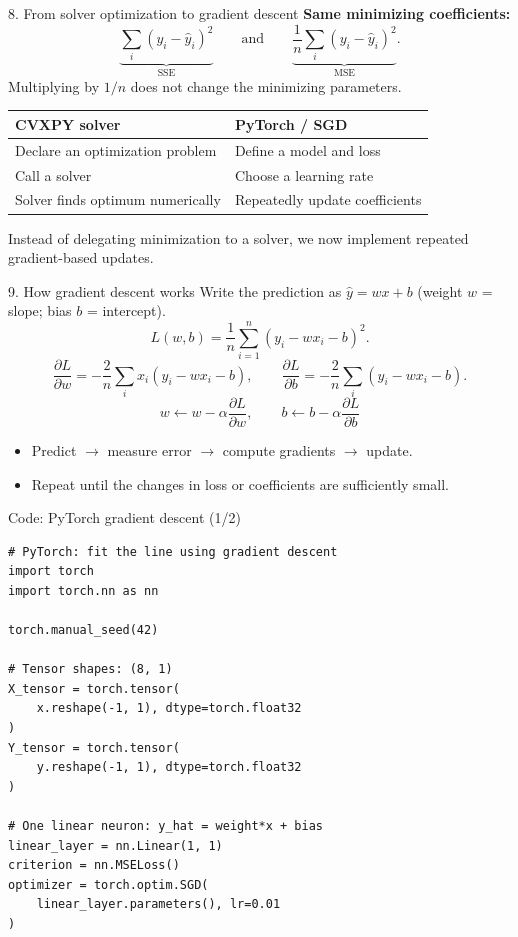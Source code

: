 \documentclass[aspectratio=43,11pt]{beamer}
\begin{document}
\begin{frame}{8. From solver optimization to gradient descent}
\small
\textbf{Same minimizing coefficients:}
\[
\underbrace{\sum_i(y_i-\widehat y_i)^2}_{\mathrm{SSE}}
\qquad\text{and}\qquad
\underbrace{\frac1n\sum_i(y_i-\widehat y_i)^2}_{\mathrm{MSE}}.
\]
Multiplying by $1/n$ does not change the minimizing parameters.
\begin{center}
\begin{tabular}{p{}|p{}}
\toprule
\textbf{CVXPY solver} & \textbf{PyTorch / SGD}\\
\midrule
Declare an optimization problem & Define a model and loss\\[4pt]
Call a solver & Choose a learning rate\\[4pt]
Solver finds optimum numerically & Repeatedly update coefficients\\
\bottomrule
\end{tabular}
\end{center}

\medskip
Instead of delegating minimization to a solver, we now implement repeated gradient-based updates.
\end{frame}

\begin{frame}{9. How gradient descent works}
\small
Write the prediction as $\widehat y=wx+b$ (weight $w$ = slope; bias $b$ = intercept).
\[
L(w,b)=\frac1n\sum_{i=1}^n(y_i-wx_i-b)^2.
\]
\[
\frac{\partial L}{\partial w}=-\frac2n\sum_i x_i(y_i-wx_i-b),\qquad
\frac{\partial L}{\partial b}=-\frac2n\sum_i(y_i-wx_i-b).
\]
\[
\boxed{w\leftarrow w-\alpha\frac{\partial L}{\partial w},\qquad
b\leftarrow b-\alpha\frac{\partial L}{\partial b}}
\]
\begin{itemize}
\item Predict $\rightarrow$ measure error $\rightarrow$ compute gradients $\rightarrow$ update.
\item Repeat until the changes in loss or coefficients are sufficiently small.
\end{itemize}
\end{frame}

\begin{frame}[fragile]{Code: PyTorch gradient descent (1/2)}
\footnotesize
\color{maroon}
\begin{verbatim}
# PyTorch: fit the line using gradient descent
import torch
import torch.nn as nn

torch.manual_seed(42)

# Tensor shapes: (8, 1)
X_tensor = torch.tensor(
    x.reshape(-1, 1), dtype=torch.float32
)
Y_tensor = torch.tensor(
    y.reshape(-1, 1), dtype=torch.float32
)

# One linear neuron: y_hat = weight*x + bias
linear_layer = nn.Linear(1, 1)
criterion = nn.MSELoss()
optimizer = torch.optim.SGD(
    linear_layer.parameters(), lr=0.01
)
\end{verbatim}
\end{frame}
\end{document}

